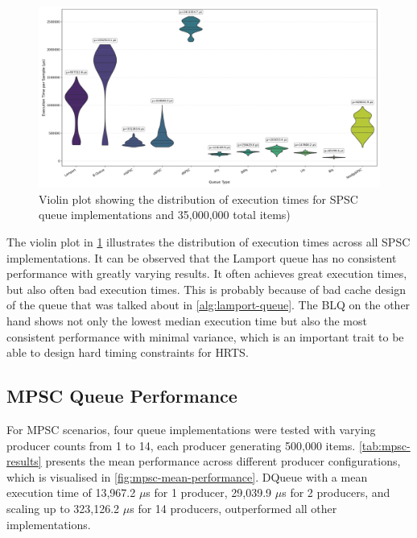 \begin{figure}[htb]
\centering
\caption{Violin plot showing the distribution of execution times for \ac{SPSC} queue implementations and 35,000,000 total items)}
\label{fig:spsc-violin}
\includegraphics[width=\textwidth]{images/results/spsc_queue_performance_violin_test.png}
\end{figure}

The violin plot in \cref{fig:spsc-violin} illustrates the distribution of execution times across all SPSC implementations. It can be observed that the Lamport queue has no consistent performance with greatly varying results. It often achieves great execution times, but also often bad execution times. This is probably because of bad cache design of the queue that was talked about in \cref{alg:lamport-queue}. The \ac{BLQ} on the other hand shows not only the lowest median execution time but also the most consistent performance with minimal variance, which is an important trait to be able to design hard timing constraints for \ac{HRTS}. 

\subsection{\acf{MPSC} Queue Performance}
For \ac{MPSC} scenarios, four queue implementations were tested with varying producer counts from 1 to 14, each producer generating 500,000 items. \cref{tab:mpsc-results} presents the mean performance across different producer configurations, which is visualised in \cref{fig:mpsc-mean-performance}. DQueue with a mean execution time of 13,967.2 $\mu$s for 1 producer, 29,039.9 $\mu$s for 2 producers, and scaling up to 323,126.2 $\mu$s for 14 producers, outperformed all other implementations.

